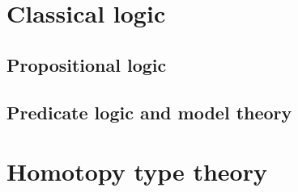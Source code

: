 \chapter{Classical logic}
\section{Propositional logic}
\section{Predicate logic and model theory}

\chapter{Homotopy type theory}

